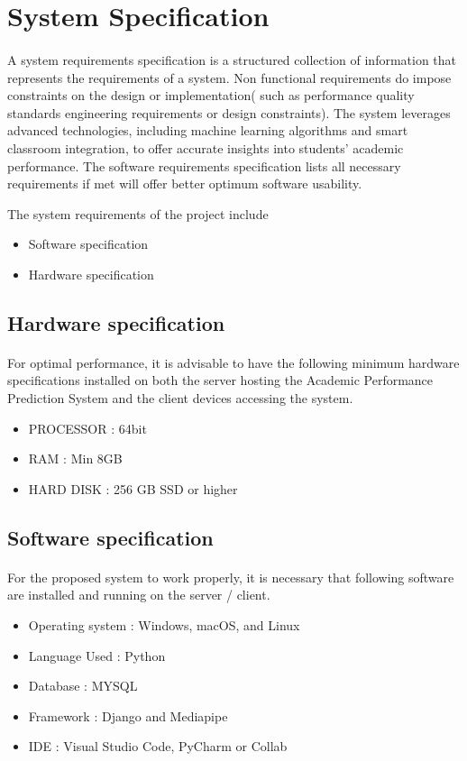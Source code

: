 \section{System Specification}
\paragraph{}
A system requirements specification is a structured collection of information that represents the requirements of a system. Non functional requirements do impose constraints on the design or implementation( such as performance quality standards engineering requirements or design constraints). The system leverages advanced technologies, including machine learning algorithms and smart classroom integration, to offer accurate insights into students' academic performance. The software requirements specification lists all necessary requirements if met will offer better optimum software usability.

The system requirements of the project include
\begin{itemize}
    \item Software specification
    \item Hardware specification
\end{itemize}

\subsection{Hardware specification}
\paragraph{}
For optimal performance, it is advisable to have the following minimum hardware specifications installed on both the server hosting the Academic Performance Prediction System and the client devices accessing the system.
\begin{itemize}
    \item PROCESSOR : 64bit
    \item RAM : Min 8GB
    \item HARD DISK : 256 GB SSD or higher
\end{itemize}

\subsection{Software specification}
\paragraph{}
For the proposed system to work properly, it is necessary that following software are installed and running on the server / client.
\begin{itemize}
    \item Operating system : Windows, macOS, and Linux
    \item Language Used : Python
    \item Database : MYSQL
    \item Framework : Django and Mediapipe
    \item IDE : Visual Studio Code, PyCharm or Collab
\end{itemize}


